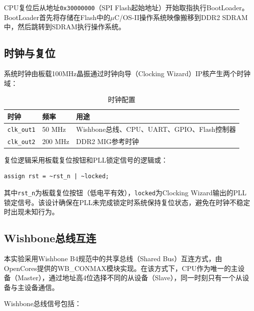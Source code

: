 CPU复位后从地址\texttt{0x30000000}（SPI Flash起始地址）开始取指执行BootLoader。BootLoader首先将存储在Flash中的$\mu$C/OS-II操作系统映像搬移到DDR2 SDRAM中，然后跳转到SDRAM执行操作系统。

\subsection{时钟与复位}

系统时钟由板载100MHz晶振通过时钟向导（Clocking Wizard）IP核产生两个时钟域：

\begin{table}[H]
    \centering
    \caption{时钟配置}
    \begin{tabular}{lll}
        \toprule
        \textbf{时钟} & \textbf{频率} & \textbf{用途} \\
        \midrule
        \texttt{clk\_out1} & 50 MHz & Wishbone总线、CPU、UART、GPIO、Flash控制器 \\
        \texttt{clk\_out2} & 200 MHz & DDR2 MIG参考时钟 \\
        \bottomrule
    \end{tabular}
\end{table}

复位逻辑采用板载复位按钮和PLL锁定信号的逻辑或：
\begin{lstlisting}[caption={复位逻辑}]
assign rst = ~rst_n | ~locked;
\end{lstlisting}
其中\texttt{rst\_n}为板载复位按钮（低电平有效），\texttt{locked}为Clocking Wizard输出的PLL锁定信号。该设计确保在PLL未完成锁定时系统保持复位状态，避免在时钟不稳定时出现未知行为。

\subsection{Wishbone总线互连}

本实验采用Wishbone B4规范中的共享总线（Shared Bus）互连方式，由OpenCores提供的WB\_CONMAX模块实现。在该方式下，CPU作为唯一的主设备（Master），通过地址高4位选择不同的从设备（Slave），同一时刻只有一个从设备与主设备通信。

Wishbone总线信号包括：

